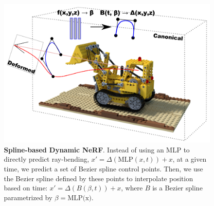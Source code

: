 \begin{figure}
    \vspace{-6mm}
    \centering
    \begin{minipage}[c]{0.5\textwidth}
    \includegraphics[width=\textwidth]{spline_nerf_diagram.png}
    \end{minipage}
    \begin{minipage}[c]{0.45\textwidth}
    \caption{
        \label{fig:arch_diagram}
        \textbf{Spline-based Dynamic NeRF}. Instead of using an MLP to directly predict ray-bending, $x' = \Delta(\text{MLP}(x, t)) + x$,  at a given time, we predict a set of Bezier spline control points. Then, we use the Bezier spline defined by these points to interpolate position based on time: \newline $x' = \Delta(B(\beta,t)) + x$, where $B$ is a Bezier spline parametrized by $\beta = \text{MLP(x)}$.
    }
    \end{minipage}
    \vspace{-10mm}
\end{figure}

